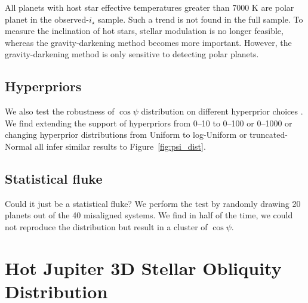 \documentclass[twocolumn,times]{aastex631}
\begin{document}
All planets with host star effective temperatures greater than 7000 K are polar planet in the observed-$i_\star$ sample. Such a trend is not found in the full sample. To measure the inclination of hot stars, stellar modulation is no longer feasible, whereas the gravity-darkening method becomes more important. However, the gravity-darkening method is only sensitive to detecting polar planets.

\subsection{Hyperpriors}
We also test the robustness of $\cos{\psi}$ distribution on different hyperprior choices \citep[see a nice summary in][]{Nagpal22}. We find extending the support of hyperpriors from 0--10 to 0--100 or 0--1000 or changing hyperprior distributions from Uniform to log-Uniform or truncated-Normal all infer similar results to Figure~\ref{fig:psi_dist}.

\subsection{Statistical fluke}
Could it just be a statistical fluke? We perform the test by randomly drawing 20 planets out of the 40 misaligned systems. We find in half of the time, we could not reproduce the distribution but result in a cluster of $\cos{\psi}$.


\section{Hot Jupiter 3D Stellar Obliquity Distribution} \label{sec:hjs}


\end{document}
